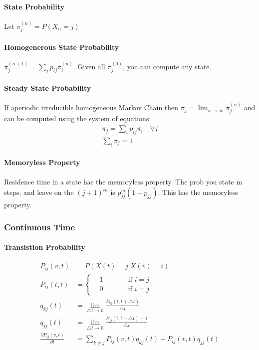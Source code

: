 \paragraph{State Probability}
Let $\pi_j^{(n)} = P(X_n = j)$

\paragraph{Homogenerous State Probability}
$\pi_j^{(n+1)} = \sum_j p_{ij} \pi_i^{(n)}$. Given all $\pi_j^{(0)}$, you can
compute any state.

\paragraph{Steady State Probability} If aperiodic irreducible homogeneous Markov
Chain then $\pi_j = \lim_{n \to \infty} \pi_j^{(n)}$ and can be computed using
the system of equations:
\begin{align*}
	\pi_j = \sum_i p_{ij} \pi_i \quad \forall j \\
	\sum_i \pi_j = 1
\end{align*}

\paragraph{Memoryless Property} Residence time in a state has the memoryless
property. The prob you state m steps, and leave on the $(j+1)^{th}$ is
$p_{jj}^m(1-p_{jj})$. This has the memoryless property.

\subsubsection{Continuous Time}

\paragraph{Transistion Probability}
\begin{align*}
	P_{ij}(v,t) &= P(X(t) = j | X(v) = i) \\
	P_{ij}(t,t) &=
	\left\{
		\begin{alignedat}{3}
			& 1  & \qquad & \mbox{if } i=j \\
			& 0  & \qquad & \mbox{if } i=j
		\end{alignedat}
	\right. \\
	q_{kj}(t) &= \lim_{\triangle t \to 0} \frac{P_{kj}(t,t+\triangle t)}{\triangle t} \\
	q_{jj}(t) &= \lim_{\triangle t \to 0} \frac{P_{jj}(t,t+\triangle t)-1}{\triangle t} \\
	\frac{ \partial P_{ij}(v,t) }{ \partial t }
	&= \sum_{k\ne j} P_{ij}(v,t) q_{kj}(t) + P_{ij}(v,t) q_{jj}(t) \\
\end{align*}

